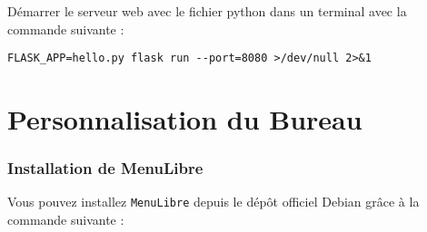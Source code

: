 Démarrer le serveur web avec le fichier python dans un terminal avec la commande suivante :
\begin{lstlisting}
FLASK_APP=hello.py flask run --port=8080 >/dev/null 2>&1
\end{lstlisting}

\chapter{Personnalisation du Bureau}

\subsection{Installation de MenuLibre}

Vous pouvez installez \texttt{MenuLibre} depuis le dépôt officiel Debian grâce à la commande suivante :
